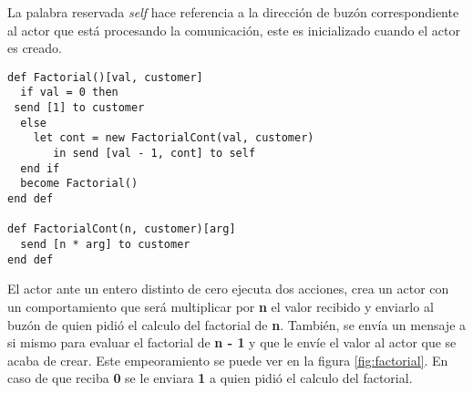 \documentclass[fleqn]{article}
\begin{document}
La palabra reservada \textit{self} hace referencia a la dirección de buzón
correspondiente al actor que está procesando la comunicación, este es inicializado
cuando el actor es creado.

\begin{lstlisting}[language=sal, style=simple]
def Factorial()[val, customer]
  if val = 0 then
 send [1] to customer
  else
    let cont = new FactorialCont(val, customer)
       in send [val - 1, cont] to self
  end if
  become Factorial()
end def

def FactorialCont(n, customer)[arg] 
  send [n * arg] to customer
end def
\end{lstlisting}

El actor ante un entero distinto de cero ejecuta dos acciones, crea un actor con
un comportamiento que será multiplicar por \textbf{n} el valor recibido y
enviarlo al buzón de quien pidió el calculo del factorial de \textbf{n}.
También, se envía un mensaje a si mismo para evaluar el factorial de \textbf{n -
  1} y que le envíe el valor al actor que se acaba de crear. Este empeoramiento
se puede ver en la figura \ref{fig:factorial}.
En caso de que reciba \textbf{0} se le enviara \textbf{1} a quien pidió el
calculo del factorial.
\end{document}

